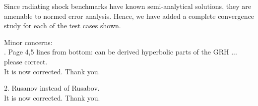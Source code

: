 \documentclass{article}
\begin{document}
Since radiating shock benchmarks have known semi-analytical solutions, they are amenable to normed error analysis. Hence, we have added a
complete convergence study for each of the test cases shown.


\bigskip

{\color{blue}
\noindent Minor concerns: \\
. Page 4,5 lines from bottom: can be derived hyperbolic parts of the GRH ... please correct.\\}
It is now corrected. Thank you.

\bigskip

{\color{blue}
 2. Rusanov instead of Rusabov.\\}
It is now corrected. Thank you.


\end{document}
